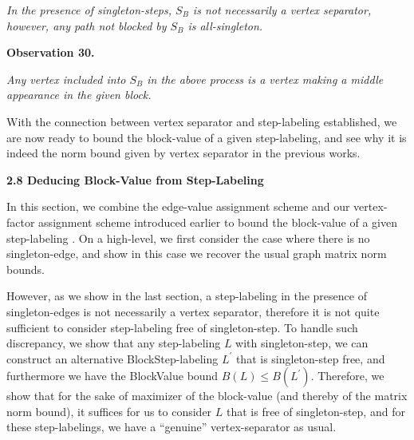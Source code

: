 \documentclass[10pt,a4paper]{article}
\begin{document}
\emph{In the presence of singleton-steps, $S_{B}$ is not necessarily a vertex separator, however, any path not blocked by $S_{B}$ is all-singleton.}\par







\par\medskip\noindent\textbf{
\textbf{Observation 30}\textbf{.}
}\par



\emph{Any vertex included into $S_{B}$ in the above process is a vertex making a middle appearance in the given block.}\par






With the connection between vertex separator and step-labeling established, we are now ready to bound the block-value of a given step-labeling, and see why it is indeed the norm bound given by vertex separator in the previous works.\par







\par\medskip\noindent\textbf{
2.8 Deducing Block-Value from Step-Labeling}\par




In this section, we combine the edge-value assignment scheme and our vertex-factor assignment scheme introduced earlier to bound the block-value of a given step-labeling
. On a high-level, we first consider the case where there is no singleton-edge, and show in this case we recover the usual graph matrix norm bounds.\par




However, as we show in the last section, a step-labeling in the presence of singleton-edges is not necessarily a vertex separator, therefore it is not quite sufficient to consider step-labeling free of singleton-step. To handle such discrepancy, we show that any step-labeling $L$ with singleton-step, we can construct an alternative BlockStep-labeling $L^{\prime}$ that is singleton-step free, and furthermore we have the BlockValue bound $B(L)\leq B(L^{\prime})$. Therefore, we show that for the sake of maximizer of the block-value (and thereby of the matrix norm bound), it suffices for us to consider $L$ that is free of singleton-step, and for these step-labelings, we have a “genuine” vertex-separator as usual.\par
\end{document}
